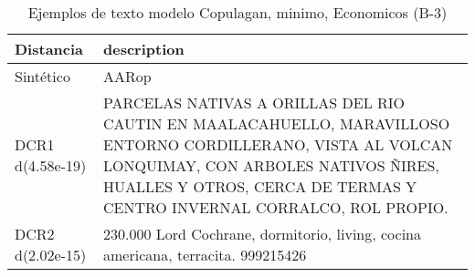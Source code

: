 \begin{table}[H]
\centering
\fontsize{10}{14}\selectfont
\caption{Ejemplos de texto modelo Copulagan, minimo, Economicos (B-3)}
\label{table-example-economicos-b-3-copulagan-min-text}
\begin{tabular}{|l|m{35em}|}
\hline
\rowcolor[gray]{0.8}
Distancia & description \\
\hline Sintético & AARop \\
\hline DCR1 d(4.58e-19) & PARCELAS NATIVAS A ORILLAS DEL RIO CAUTIN EN MAALACAHUELLO, MARAVILLOSO ENTORNO CORDILLERANO, VISTA AL VOLCAN LONQUIMAY, CON ARBOLES NATIVOS \~NIRES, HUALLES Y OTROS, CERCA DE TERMAS Y CENTRO INVERNAL CORRALCO, ROL PROPIO. \\
\hline DCR2 d(2.02e-15) & 230.000 Lord Cochrane, dormitorio, living, cocina americana, terracita. 999215426 \\
\hline
\end{tabular}
\end{table}
